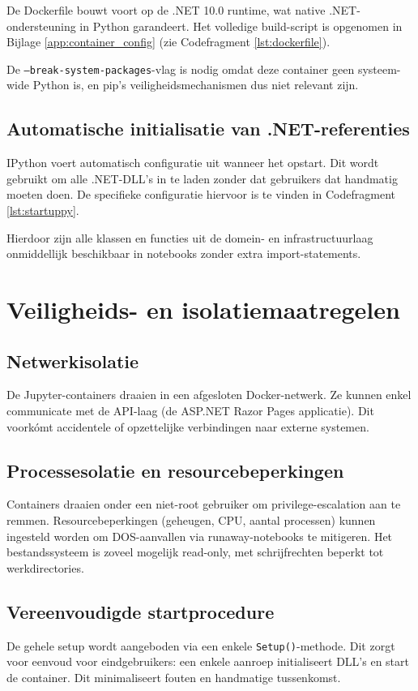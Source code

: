 De Dockerfile bouwt voort op de .NET 10.0 runtime, wat native .NET-ondersteuning in Python garandeert. Het volledige build-script is opgenomen in Bijlage \ref{app:container_config} (zie Codefragment \ref{lst:dockerfile}).

De \texttt{--break-system-packages}-vlag is nodig omdat deze container geen systeem-wide Python is,
en pip's veiligheidsmechanismen dus niet relevant zijn.

\subsection{Automatische initialisatie van .NET-referenties}

IPython voert automatisch configuratie uit wanneer het opstart. Dit wordt gebruikt om alle .NET-DLL's
in te laden zonder dat gebruikers dat handmatig moeten doen. De specifieke configuratie hiervoor is te vinden in Codefragment \ref{lst:startuppy}.

Hierdoor zijn alle klassen en functies uit de domein- en infrastructuurlaag onmiddellijk beschikbaar
in notebooks zonder extra import-statements.

\section{Veiligheids- en isolatiemaatregelen}

\subsection{Netwerkisolatie}

De Jupyter-containers draaien in een afgesloten Docker-netwerk. Ze kunnen enkel communicate met de API-laag
(de ASP.NET Razor Pages applicatie). Dit voorkómt accidentele of opzettelijke verbindingen naar externe systemen.

\subsection{Processesolatie en resourcebeperkingen}

Containers draaien onder een niet-root gebruiker om privilege-escalation aan te remmen.
Resourcebeperkingen (geheugen, CPU, aantal processen) kunnen ingesteld worden om DOS-aanvallen via runaway-notebooks
te mitigeren. Het bestandssysteem is zoveel mogelijk read-only, met schrijfrechten beperkt tot werkdirectories.

\subsection{Vereenvoudigde startprocedure}

De gehele setup wordt aangeboden via een enkele \texttt{Setup()}-methode. Dit zorgt voor eenvoud voor eindgebruikers:
een enkele aanroep initialiseert DLL's en start de container. Dit minimaliseert fouten en handmatige tussenkomst.
